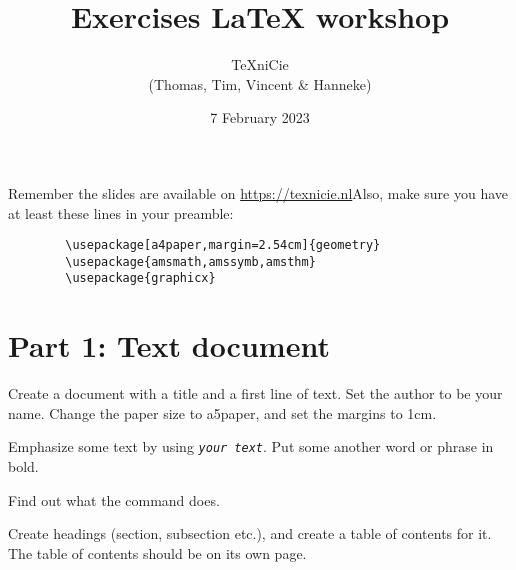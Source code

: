 \documentclass[a4paper]{article}
\title{\vspace{-65pt} Exercises LaTeX workshop}
\author{\TeX niCie\\
{\small (Thomas, Tim, Vincent \& Hanneke)}
}
\date{7 February 2023}
\begin{document}
\maketitle


Remember the slides are available on \url{https://texnicie.nl}\quad Also, make sure you have at least these lines in your preamble:
\begin{verbatim}
        \usepackage[a4paper,margin=2.54cm]{geometry}
        \usepackage{amsmath,amssymb,amsthm}
        \usepackage{graphicx}
    \end{verbatim}

\section{Part 1: Text document}

\begin{exercise}
    Create a document with a title and a first line of text. Set the author to
    be your name. Change the paper size to a5paper, and set the margins to 1cm.
\end{exercise}

\begin{exercise}[emphasize]
    Emphasize some text by using \texttt{\emph{your text}}. Put some another word
    or phrase in bold.
    
\end{exercise}

\begin{exercise}[flushright]
    Find out what the \texttt{\flushright} command does.
\end{exercise}

\begin{exercise}[headings]
    Create headings (section, subsection etc.), and create
    a table of contents for it. The table of contents should be on its own page.
\end{exercise}
\end{document}
